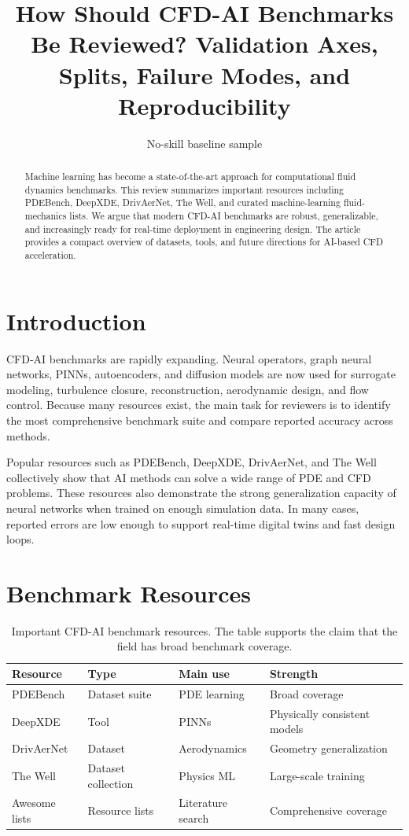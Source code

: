 \documentclass[11pt]{article}
\title{How Should CFD-AI Benchmarks Be Reviewed? Validation Axes, Splits, Failure Modes, and Reproducibility}
\author{No-skill baseline sample}
\date{}
\begin{document}
\maketitle

\begin{abstract}
Machine learning has become a state-of-the-art approach for computational fluid dynamics benchmarks. This review summarizes important resources including PDEBench, DeepXDE, DrivAerNet, The Well, and curated machine-learning fluid-mechanics lists. We argue that modern CFD-AI benchmarks are robust, generalizable, and increasingly ready for real-time deployment in engineering design. The article provides a compact overview of datasets, tools, and future directions for AI-based CFD acceleration.
\end{abstract}

\section{Introduction}
CFD-AI benchmarks are rapidly expanding. Neural operators, graph neural networks, PINNs, autoencoders, and diffusion models are now used for surrogate modeling, turbulence closure, reconstruction, aerodynamic design, and flow control. Because many resources exist, the main task for reviewers is to identify the most comprehensive benchmark suite and compare reported accuracy across methods.

Popular resources such as PDEBench, DeepXDE, DrivAerNet, and The Well collectively show that AI methods can solve a wide range of PDE and CFD problems. These resources also demonstrate the strong generalization capacity of neural networks when trained on enough simulation data. In many cases, reported errors are low enough to support real-time digital twins and fast design loops.

\section{Benchmark Resources}
\begin{table}[h]
\centering
\begin{tabular}{llll}
\toprule
Resource & Type & Main use & Strength \\
\midrule
PDEBench & Dataset suite & PDE learning & Broad coverage \\
DeepXDE & Tool & PINNs & Physically consistent models \\
DrivAerNet & Dataset & Aerodynamics & Geometry generalization \\
The Well & Dataset collection & Physics ML & Large-scale training \\
Awesome lists & Resource lists & Literature search & Comprehensive coverage \\
\bottomrule
\end{tabular}
\caption{Important CFD-AI benchmark resources. The table supports the claim that the field has broad benchmark coverage.}
\end{table}
\end{document}
